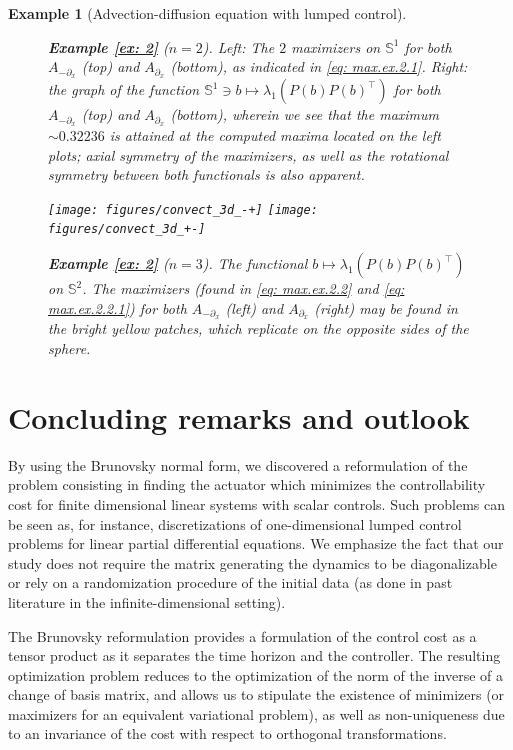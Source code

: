 \documentclass[journal,twoside,web]{ieeecolor}
\newcommand{\del}{\partial}
\newtheorem{example}{Example}
\begin{document}
\begin{example}[Advection-diffusion equation with lumped control]
\begin{figure}
	\caption{\textbf{Example \ref{ex: 2}} ($n=2$). \emph{Left}: The $2$ maximizers on $\mathbb{S}^1$ for both $A_{-\del_x}$ (\emph{top}) and $A_{\del_x}$ (\emph{bottom}), as indicated in \eqref{eq: max.ex.2.1}. \emph{Right}: the graph of the function $\mathbb{S}^1\ni b\mapsto\lambda_1(P(b)P(b)^\top)$ for both $A_{-\del_x}$ (\emph{top}) and $A_{\del_x}$ (\emph{bottom}), wherein we see that the maximum $\sim0.32236$ is attained at the computed maxima located on the left plots; axial symmetry of the maximizers, as well as the rotational symmetry between both functionals is also apparent.}
	\label{fig: ex2.1}
	\end{figure}
	
	\begin{figure}
	\begin{center}
	\texttt{[image: figures/convect\_3d\_-+]}
	\texttt{[image: figures/convect\_3d\_+-]}	
	\end{center}
	\caption{\textbf{Example \ref{ex: 2}} ($n=3$). The functional $b\mapsto \lambda_1(P(b)P(b)^\top)$ on $\mathbb{S}^2$. The maximizers (found in \eqref{eq: max.ex.2.2} and \eqref{eq: max.ex.2.2.1}) for both $A_{-\del_x}$ (\emph{left}) and $A_{\del_x}$ (\emph{right}) may be found in the bright yellow patches, which replicate on the opposite sides of the sphere.}
	\label{fig: ex2.2}
	\end{figure}
	
	\end{example}
	
	\section{Concluding remarks and outlook}
	
	By using the Brunovsky normal form, we discovered a reformulation of the problem consisting in finding the actuator which minimizes the controllability cost for finite dimensional linear systems with scalar controls. Such problems can be seen as, for instance, discretizations of one-dimensional lumped control problems for linear partial differential equations. We emphasize the fact that our study does not require the matrix generating the dynamics to be diagonalizable or rely on a randomization procedure of the initial data (as done in past literature in the infinite-dimensional setting).
	
	The Brunovsky reformulation provides a formulation of the control cost as a tensor product as it separates the time horizon and the controller. The resulting optimization problem reduces to the optimization of the norm of the inverse of a change of basis matrix, and allows us to stipulate the existence of minimizers (or maximizers for an equivalent variational problem), as well as non-uniqueness due to an invariance of the cost with respect to orthogonal transformations. 
	
\end{document}
